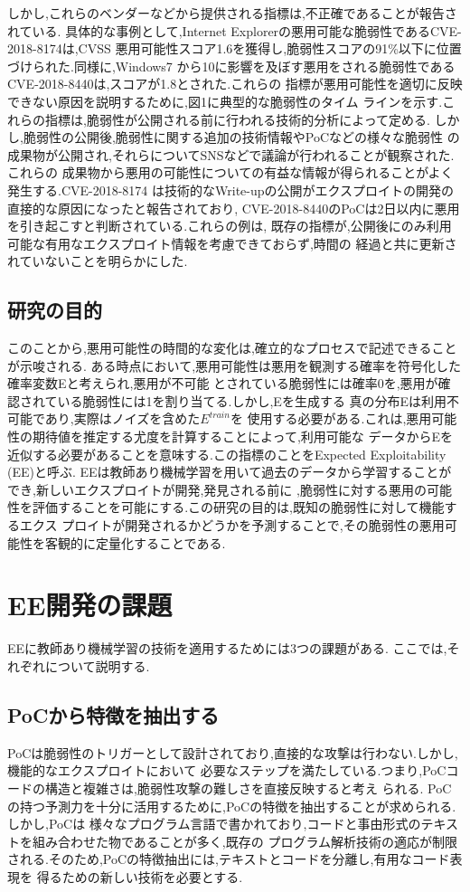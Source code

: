 \documentclass[submit,techreq,noauthor]{eco}	%
\begin{document}
しかし,これらのベンダーなどから提供される指標は,不正確であることが報告されている.
具体的な事例として,Internet Explorerの悪用可能な脆弱性であるCVE-2018-8174は,CVSS
悪用可能性スコア1.6を獲得し,脆弱性スコアの91\%以下に位置づけられた.同様に,Windows7
から10に影響を及ぼす悪用をされる脆弱性であるCVE-2018-8440は,スコアが1.8とされた.これらの
指標が悪用可能性を適切に反映できない原因を説明するために,図1に典型的な脆弱性のタイム
ラインを示す.これらの指標は,脆弱性が公開される前に行われる技術的分析によって定める.
しかし,脆弱性の公開後,脆弱性に関する追加の技術情報やPoCなどの様々な脆弱性
の成果物が公開され,それらについてSNSなどで議論が行われることが観察された.これらの
成果物から悪用の可能性についての有益な情報が得られることがよく発生する.CVE-2018-8174
は技術的なWrite-upの公開がエクスプロイトの開発の直接的な原因になったと報告されており,
CVE-2018-8440のPoCは2日以内に悪用を引き起こすと判断されている.これらの例は,
既存の指標が,公開後にのみ利用可能な有用なエクスプロイト情報を考慮できておらず,時間の
経過と共に更新されていないことを明らかにした.

\subsection*{研究の目的}
\indent このことから,悪用可能性の時間的な変化は,確立的なプロセスで記述できることが示唆される.
ある時点において,悪用可能性は悪用を観測する確率を符号化した確率変数Eと考えられ,悪用が不可能
とされている脆弱性には確率0を,悪用が確認されている脆弱性には1を割り当てる.しかし,Eを生成する
真の分布Eは利用不可能であり,実際はノイズを含めた\begin{math}E^{train}\end{math}を
使用する必要がある.これは,悪用可能性の期待値を推定する尤度を計算することによって,利用可能な
データからEを近似する必要があることを意味する.この指標のことをExpected Exploitability (EE)と呼ぶ.
EEは教師あり機械学習を用いて過去のデータから学習することができ,新しいエクスプロイトが開発,発見される前に
,脆弱性に対する悪用の可能性を評価することを可能にする.この研究の目的は,既知の脆弱性に対して機能するエクス
プロイトが開発されるかどうかを予測することで,その脆弱性の悪用可能性を客観的に定量化することである.

\section{EE開発の課題}
EEに教師あり機械学習の技術を適用するためには3つの課題がある.
ここでは,それぞれについて説明する.

\subsection*{PoCから特徴を抽出する}
PoCは脆弱性のトリガーとして設計されており,直接的な攻撃は行わない.しかし,機能的なエクスプロイトにおいて
必要なステップを満たしている.つまり,PoCコードの構造と複雑さは,脆弱性攻撃の難しさを直接反映すると考え
られる. PoCの持つ予測力を十分に活用するために,PoCの特徴を抽出することが求められる.しかし,PoCは
様々なプログラム言語で書かれており,コードと事由形式のテキストを組み合わせた物であることが多く,既存の
プログラム解析技術の適応が制限される.そのため,PoCの特徴抽出には,テキストとコードを分離し,有用なコード表現を
得るための新しい技術を必要とする.
\end{document}
